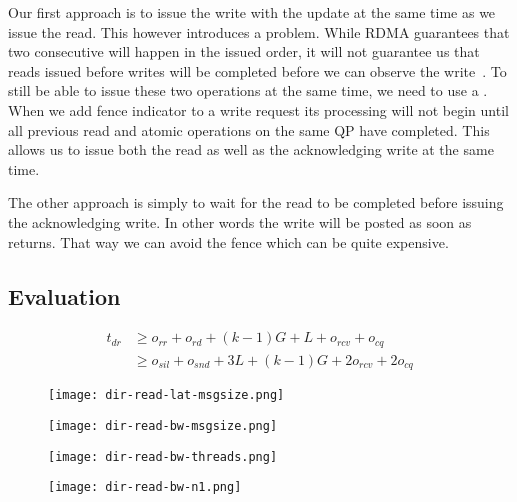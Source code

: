 Our first approach is to issue the write with the update at the same time as we issue the read. This however introduces a 
problem. While RDMA guarantees that two consecutive will happen in the issued order, it will not guarantee us that reads issued
before writes will be completed before we can observe the write~\cite{}.  To still be able to issue these two operations at the same time, we need to use a . When we add 
fence indicator to a write request its processing will not begin until all previous read and atomic operations on the same QP 
have completed. This allows us to issue both the read as well as the acknowledging write at the same time.

The other approach is simply to wait for the read to be completed before issuing the acknowledging write. In other words the
write will be posted as soon as  returns. That way we can avoid the fence which can be quite expensive.

\subsection{Evaluation}


\begin{align*}
  t_{dr} &\geq o_{rr} + o_{rd} + (k-1)G + L  + o_{rcv} + o_{cq}\\
         &\geq o_{sil} + o_{snd} + 3L  + (k-1)G  + 2o_{rcv} + 2o_{cq}
\end{align*}


\begin{figure}[h]
\texttt{[image: dir-read-lat-msgsize.png]}
\label{fig:plot-dirread-lat}
\end{figure}


\begin{figure}[h]
\texttt{[image: dir-read-bw-msgsize.png]}
\label{fig:plot-dirread-bw}
\end{figure}



\begin{figure}[h]
\texttt{[image: dir-read-bw-threads.png]}
\label{fig:plot-dirread-bw-threads}
\end{figure}


\begin{figure}[h]
\texttt{[image: dir-read-bw-n1.png]}
\label{fig:plot-dirread-bw-n1}
\end{figure}
